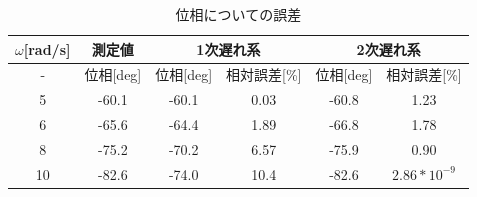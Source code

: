 \documentclass{jsarticle}
\begin{document}
\begin{table}[hb]
 \begin{center}
  \caption{位相についての誤差}
  \begin{tabular}{|c||c||c|c||c|c|} \hline
   \multicolumn{1}{|c||}{$\omega$[rad/s]}
   & \multicolumn{1}{c||}{測定値}
       & \multicolumn{2}{|c||}{1次遅れ系}
   & \multicolumn{2}{|c|}{2次遅れ系} \\ \hline \hline
   - & 位相[deg] & 位相[deg] &  相対誤差[\%] & 位相[deg] & 相対誤差[\%] \\ \hline \hline
   5  & -60.1 & -60.1 & 0.03 & -60.8 & 1.23 \\ \hline
   6  & -65.6 & -64.4 & 1.89 & -66.8 & 1.78 \\ \hline
   8  & -75.2 & -70.2 & 6.57 & -75.9 & 0.90 \\ \hline
   10 & -82.6 & -74.0 & 10.4 & -82.6 & $2.86*10^{-9}$\\ \hline
  \end{tabular}
 \end{center}
\end{table}
\end{document}
